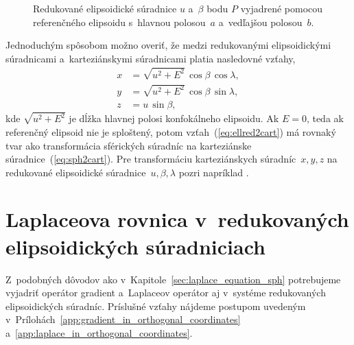 \documentclass[a4paper, 12pt]{book}
\begin{document}
\begin{figure}
\centering

\caption{Redukované elipsoidické súradnice $u$ a~$\beta$ bodu $P$ vyjadrené 
pomocou referenčného elipsoidu s~hlavnou polosou~$a$ a~vedľajšou polosou~$b$.}
\label{fig:reduced_ell_coords}
\end{figure}
Jednoduchým spôsobom možno overiť, že medzi redukovanými elipsoidickými 
súradnicami a~karteziánskymi súradnicami platia nasledovné vzťahy,
%
\begin{equation}
\label{eq:ellred2cart}
\begin{split}
x &= \sqrt{u^2 + E^2} \, \cos\beta \, \cos\lambda{,}\\
y &= \sqrt{u^2 + E^2} \, \cos\beta \, \sin\lambda{,}\\
z &= u \, \sin\beta{,}
\end{split}
\end{equation}
%
kde $\sqrt{u^2 + E^2}$ je dĺžka hlavnej polosi konfokálneho elipsoidu.  Ak $E 
= 0$, teda ak referenčný elipsoid nie je sploštený, potom 
vzťah~(\ref{eq:ellred2cart}) má rovnaký tvar ako transformácia sférických 
súradníc na karteziánske súradnice~(\ref{eq:sph2cart}).  Pre transformáciu 
karteziánskych súradníc~$x, y, z$ na redukované elipsoidické súradnice~$u, 
\beta, \lambda$ pozri napríklad \textcite{MoritzPhysicalGeodesy}.



\section{Laplaceova rovnica v~redukovaných elipsoidických súradniciach}
\label{sec:laplace_in_reduced_ell_coords}

Z~podobných dôvodov ako v~Kapitole~\ref{sec:laplace_equation_sph} potrebujeme 
vyjadriť operátor gradient a~Laplaceov operátor aj v~systéme redukovaných 
elipsoidických súradníc.  Príslušné vzťahy nájdeme postupom uvedeným 
v~Prílohách~\ref{app:gradient_in_orthogonal_coordinates} 
a~\ref{app:laplace_in_orthogonal_coordinates}.
\end{document}
